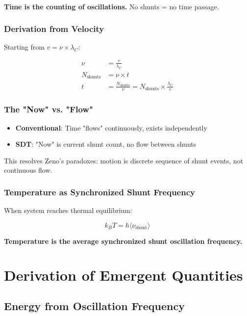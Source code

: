 \textbf{Time is the counting of oscillations.} No shunts = no time passage.

\subsubsection{Derivation from Velocity}

Starting from $v = \nu \times \lambda_C$:

\begin{align}
\nu &= \frac{v}{\lambda_C} \\
N_{\text{shunts}} &= \nu \times t \\
t &= \frac{N_{\text{shunts}}}{\nu} = N_{\text{shunts}} \times \frac{\lambda_C}{v}
\end{align}

\subsubsection{The "Now" vs. "Flow"}

\begin{itemize}
\item \textbf{Conventional}: Time "flows" continuously, exists independently
\item \textbf{SDT}: "Now" is current shunt count, no flow between shunts
\end{itemize}

This resolves Zeno's paradoxes: motion is discrete sequence of shunt events, not continuous flow.

\subsubsection{Temperature as Synchronized Shunt Frequency}

When system reaches thermal equilibrium:

\begin{equation}
k_B T = h \langle \nu_{\text{shunt}} \rangle
\label{eq:temperature_shunts}
\end{equation}

\textbf{Temperature is the average synchronized shunt oscillation frequency.}

\section{Derivation of Emergent Quantities}

\subsection{Energy from Oscillation Frequency}

